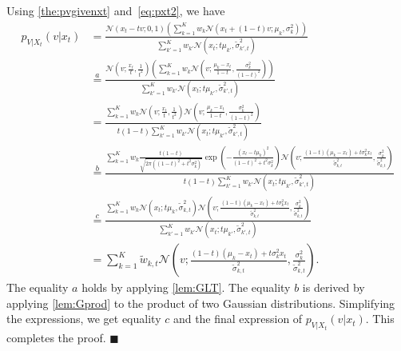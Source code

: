 Using \cref{the:pvgivenxt} and~\cref{eq:pxt2}, %
we have
\begin{align}
    \label{eq:pvgivenxt2}
    p_{V | X_t} (v | x_t) %
    & = \frac{\mathcal{N}\left( x_t - tv; 0, 1 \right) \left( \sum_{k=1}^K w_k \mathcal{N}\left(x_t + (1-t)v; \mu_k, \sigma_k^2 \right) \right) }{ \sum_{k' = 1}^K w_{k'} \mathcal{N} \left(x_t; t\mu_{k'}, \tilde{\sigma}_{k', t}^2 \right)} \nonumber \\
    & \stackrel{a}{=} \frac{\mathcal{N}\left( v; \frac{x_t}{t}, \frac{1}{t^2} \right) \left( \sum_{k=1}^K w_k \mathcal{N}\left(v; \frac{\mu_k - x_t}{1-t}, \frac{\sigma_k^2}{(1-t)^2} \right) \right) }{ \sum_{k' = 1}^K w_{k'} \mathcal{N} \left(x_t; t\mu_{k'}, \tilde{\sigma}_{k', t}^2 \right)} \nonumber \\
    & =  \frac{\sum_{k=1}^K w_k\mathcal{N}\left( v; \frac{x_t}{t}, \frac{1}{t^2} \right) \mathcal{N}\left(v; \frac{\mu_k - x_t}{1-t}, \frac{\sigma_k^2}{(1-t)^2} \right) }{ t(1-t)\sum_{k' = 1}^K w_{k'} \mathcal{N} \left(x_t; t\mu_{k'}, \tilde{\sigma}_{k', t}^2 \right)} \nonumber \\
    & \stackrel{b}{=} \frac{\sum_{k = 1}^K w_k \frac{t(1-t)}{\sqrt{2\pi((1-t)^2 + t^2 \sigma_k^2)}} \exp\left( -\frac{(x_t - t\mu_k)^2}{(1-t)^2 + t^2 \sigma_k^2}\right) \mathcal{N}\left(v; \frac{(1-t)(\mu_k - x_t) + t\sigma_k^2 x_t }{\tilde{\sigma}_{k, t}^2}, \frac{\sigma_k^2}{\tilde{\sigma}_{k, t}^2} \right)}{t(1-t)\sum_{k' = 1}^K w_{k'} \mathcal{N} \left(x_t; t\mu_{k'}, \tilde{\sigma}_{k', t}^2 \right)} \nonumber \\
    & \stackrel{c}{=} \frac{\sum_{k = 1}^K w_k \mathcal{N}\left(x_t; t\mu_{k}, \tilde{\sigma}_{k, t}^2 \right) \mathcal{N}\left(v; \frac{(1-t)(\mu_k - x_t) + t\sigma_k^2 x_t }{\tilde{\sigma}_{k, t}^2}, \frac{\sigma_k^2}{\tilde{\sigma}_{k, t}^2} \right)}{\sum_{k' = 1}^K w_{k'} \mathcal{N} \left(x_t; t\mu_{k'}, \tilde{\sigma}_{k', t}^2 \right)} \nonumber \\
    & = \sum_{k = 1}^K \tilde{w}_{k, t} \mathcal{N}\left(v; \frac{(1-t)(\mu_k - x_t) + t\sigma_k^2 x_t }{\tilde{\sigma}_{k, t}^2}, \frac{\sigma_k^2}{\tilde{\sigma}_{k, t}^2} \right).
\end{align}
The equality $a$ holds by applying \cref{lem:GLT}. %
The equality $b$ is derived by applying \cref{lem:Gprod} to the product of two Gaussian distributions. Simplifying the expressions, we get equality $c$ and the final expression of $p_{V|X_t}(v|x_t)$. This completes the proof. 
\hfill$\blacksquare$



